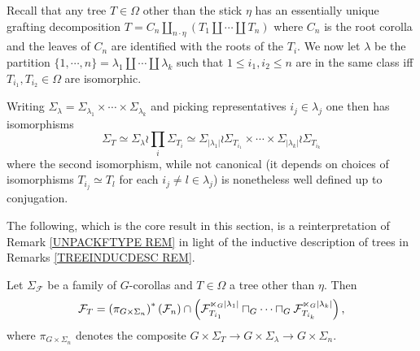 \documentclass[a4paper,10pt]{article}%
\begin{document}
\begin{remark}\label{TREEINDUCDESC REM}
Recall that any tree $T \in \Omega$ other than the stick $\eta$ has an essentially unique grafting decomposition
$T= C_n \amalg_{n \cdot \eta}(T_1 \amalg \cdots \amalg T_n)$ where $C_n$ is the root corolla and the leaves of $C_n$ are identified with the roots of the $T_i$. We now let 
$\lambda$ be the partition 
$\{1,\cdots,n\} = \lambda_1 \amalg\cdots \amalg \lambda_k$
 such that $1 \leq i_1, i_2 \leq n$ are in the same class iff
 $T_{i_1}, T_{i_2} \in \Omega$ are isomorphic.
 
 Writing 
 $\Sigma_{\lambda} = \Sigma_{\lambda_1} \times \cdots \times
 \Sigma_{\lambda_k}$
and picking representatives $i_j \in \lambda_j$ 
one then has isomorphisms
\begin{equation}\label{TREEISOT EQ}
	\Sigma_T \simeq \Sigma_{\lambda} \wr \prod_{i} \Sigma_{T_i}
		\simeq
	\Sigma_{|\lambda_1|} \wr \Sigma_{T_{i_1}}
		\times \cdots \times	
	\Sigma_{|\lambda_k|} \wr \Sigma_{T_{i_k}}
\end{equation}
where the second isomorphism, while not canonical 
(it depends on choices of isomorphisms $T_{i_j} \simeq T_l$ for each $i_j \neq l \in \lambda_j$) is nonetheless well defined up to conjugation.
\end{remark}


The following, which is the core result in this section, is a reinterpretation of 
Remark \ref{UNPACKFTYPE REM}
in light of the inductive description of trees in
Remarks \ref{TREEINDUCDESC REM}.


\begin{lemma}\label{KEYLEMMAGECO LEM}
Let $\Sigma_\mathcal{F}$ be a family of $G$-corollas and 
$T \in \Omega$ a tree other than $\eta$. Then
\begin{equation}\label{KEYLEMMAGECO EQ}
	\mathcal{F}_T =
	\left(\pi_{G \times \Sigma_n}\right)^{\**}(\mathcal{F}_n)
		\cap
	\left(
	\mathcal{F}_{T_{i_1}}^{\ltimes_G |\lambda_1|}
		\sqcap_G \cdots \sqcap_G
	\mathcal{F}_{T_{i_k}}^{\ltimes_G |\lambda_k|}
	\right),
\end{equation}
where $\pi_{G \times \Sigma_n}$ denotes the composite
$G \times \Sigma_T \to G \times \Sigma_{\lambda} \to
 G \times \Sigma_n$.
\end{lemma}
\end{document}
